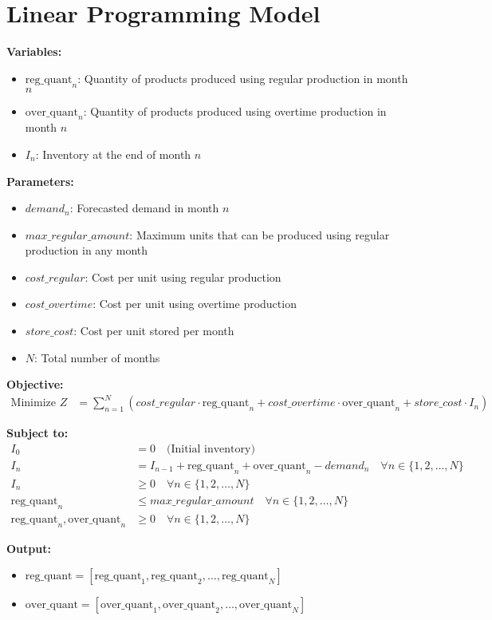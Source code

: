 \documentclass{article}
\begin{document}
\section*{Linear Programming Model}

\textbf{Variables:}
\begin{itemize}
    \item $\text{reg\_quant}_n$: Quantity of products produced using regular production in month $n$
    \item $\text{over\_quant}_n$: Quantity of products produced using overtime production in month $n$
    \item $I_n$: Inventory at the end of month $n$
\end{itemize}

\textbf{Parameters:}
\begin{itemize}
    \item $demand_n$: Forecasted demand in month $n$
    \item $max\_regular\_amount$: Maximum units that can be produced using regular production in any month
    \item $cost\_regular$: Cost per unit using regular production
    \item $cost\_overtime$: Cost per unit using overtime production
    \item $store\_cost$: Cost per unit stored per month
    \item $N$: Total number of months
\end{itemize}

\textbf{Objective:}
\begin{align*}
\text{Minimize } Z &= \sum_{n=1}^{N} \left( cost\_regular \cdot \text{reg\_quant}_n + cost\_overtime \cdot \text{over\_quant}_n + store\_cost \cdot I_n \right)
\end{align*}

\textbf{Subject to:}
\begin{align*}
I_0 &= 0 \quad \text{(Initial inventory)}\\
I_n &= I_{n-1} + \text{reg\_quant}_n + \text{over\_quant}_n - demand_n \quad \forall n \in \{1, 2, \ldots, N\}\\
I_n &\geq 0 \quad \forall n \in \{1, 2, \ldots, N\}\\
\text{reg\_quant}_n &\leq max\_regular\_amount \quad \forall n \in \{1, 2, \ldots, N\}\\
\text{reg\_quant}_n, \text{over\_quant}_n &\geq 0 \quad \forall n \in \{1, 2, \ldots, N\}
\end{align*}

\textbf{Output:}
\begin{itemize}
    \item $\text{reg\_quant} = [\text{reg\_quant}_1, \text{reg\_quant}_2, \ldots, \text{reg\_quant}_N]$
    \item $\text{over\_quant} = [\text{over\_quant}_1, \text{over\_quant}_2, \ldots, \text{over\_quant}_N]$
\end{itemize}
\end{document}
